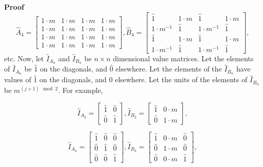 \documentclass[10pt,letterpaper]{article}
\newenvironment{proof}{\noindent\textbf{Proof} }{\qed \newline}
\newcommand{\qed}{\nobreak \ifvmode \relax \else
      \ifdim\lastskip<1.5em \hskip-\lastskip
      \hskip1.5em plus0em minus0.5em \fi \nobreak
      \vrule height0.75em width0.5em depth0.25em\fi}
\numberwithin{equation}{section}
\begin{document}
\begin{proof}
\[ \hat A_4 = \left[ \begin{matrix} 
  1 \cdot m & 1 \cdot m & 1 \cdot m & 1 \cdot m \\
  1 \cdot m & 1 \cdot m & 1 \cdot m & 1 \cdot m \\
  1 \cdot m & 1 \cdot m & 1 \cdot m & 1 \cdot m \\
  1 \cdot m & 1 \cdot m & 1 \cdot m & 1 \cdot m
 \end{matrix} \right],
 \hat B_4 = \left[ \begin{matrix} 
  \hat 1 & 1 \cdot m & \hat 1 & 1 \cdot m \\
  1 \cdot m^{-1} & \hat 1 & 1 \cdot m^{-1} & \hat 1 \\
  \hat 1 & 1 \cdot m & \hat 1 & 1 \cdot m \\
  1 \cdot m^{-1} & \hat 1 & 1 \cdot m^{-1} & \hat 1
\end{matrix} \right], \] etc.  Now, let $\hat I_{A_n}$ and $\hat
I_{B_n}$ be $n \times n$ dimensional value matrices.  Let the elements
of $\hat I_{A_n}$ be $\hat 1$ on the diagonals, and $\hat 0$
elsewhere.  Let the elements of the $\hat I_{B_n}$ have values of $\hat 1$ on
the diagonals, and $\hat 0$ elsewhere.  Let the units of the elements of
$\hat I_{B_n}$ be $m^{(j + 1) \mod 2}$.  For example,

\[ \hat I_{A_2} = \left[ \begin{matrix} 
  \hat 1 & \hat 0 \\
  \hat 0 & \hat 1
 \end{matrix} \right] ,
\hat I_{B_2} = \left[ \begin{matrix} 
  \hat 1 & 0 \cdot m \\
  \hat 0 & 1 \cdot m
 \end{matrix} \right] , \]
 
 \[ \hat I_{A_3} = \left[ \begin{matrix} 
  \hat 1 & \hat 0 & \hat 0 \\
  \hat 0 & \hat 1 & \hat 0 \\
  \hat 0 & \hat 0 & \hat 1
 \end{matrix} \right] ,
 \hat I_{B_3} = \left[ \begin{matrix} 
  \hat 1 & 0 \cdot m & \hat 0 \\
  \hat 0 & 1 \cdot m & \hat 0 \\
  \hat 0 & 0 \cdot m & \hat 1
 \end{matrix} \right] , \]
 

\end{proof}
\end{document}
